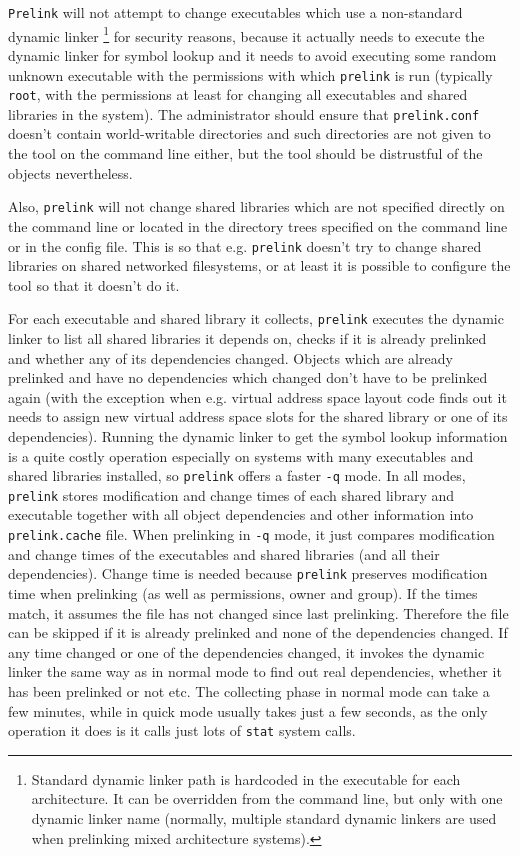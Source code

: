\documentclass[twoside]{article}
\def\tts#1{\texttt{\small #1}}
\begin{document}
\tts{Prelink} will not attempt to change executables which use a non-standard
dynamic linker
\footnote{Standard dynamic linker path is hardcoded in the executable for each
architecture.  It can be overridden from the command line, but only with
one dynamic linker name (normally, multiple standard dynamic linkers are
used when prelinking mixed architecture systems).}
for security reasons, because it actually needs to execute the dynamic
linker for symbol lookup and it needs to avoid executing some random
unknown executable with the permissions with which \tts{prelink} is run
(typically \tts{root}, with the permissions at least for changing all
executables and shared libraries in the system).  The administrator should
ensure that \tts{prelink.conf} doesn't contain world-writable directories
and such directories are not given to the tool on the command line either,
but the tool should be distrustful of the objects nevertheless.

Also, \tts{prelink} will not change shared libraries which are not specified
directly on the command line or located in the directory trees specified on the
command line or in the config file.  This is so that
e.g. \tts{prelink} doesn't try to change shared libraries on shared
networked filesystems, or at least it is possible to configure the tool
so that it doesn't do it.

For each executable and shared library it collects, \tts{prelink} executes
the dynamic linker to list all shared libraries it depends on, checks if
it is already prelinked and whether any of its dependencies changed.
Objects which are already prelinked and have no dependencies which changed
don't have to be prelinked again (with the exception when e.g. virtual
address space layout code finds out it needs to assign new virtual address space slots
for the shared library or one of its dependencies).  Running the dynamic
linker to get the symbol lookup information is a quite costly
operation especially on systems with many executables and shared libraries
installed, so \tts{prelink} offers a faster \tts{-q} mode.  In all modes,
\tts{prelink} stores modification and change times of each shared library
and executable together with all object dependencies and other information
into \tts{prelink.cache} file.  When prelinking in \tts{-q} mode, it
just compares modification and change times of the executables and shared
libraries (and all their dependencies).  Change time is needed because
\tts{prelink} preserves modification time when prelinking (as well as
permissions, owner and group).  If the times match, it assumes the
file has not changed since last prelinking.  Therefore the file can be
skipped if it is already prelinked and none of the dependencies changed.
If any time changed or one of the dependencies changed, it invokes the
dynamic linker the same way as in normal mode to find out real dependencies,
whether it has been prelinked or not etc.  The collecting phase in normal
mode can take a few minutes, while in quick mode usually takes just a few
seconds, as the only operation it does is it calls just lots of \tts{stat}
system calls.
\end{document}
